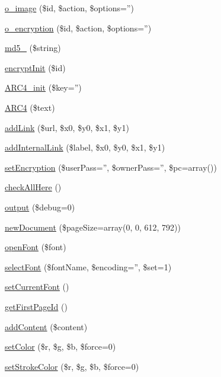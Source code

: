 \begin{DoxyCompactItemize}
\hyperlink{class_cpdf_ac2199fd5ae0ff08a49c57dc48cea87be}{o\-\_\-image} (\$id, \$action, \$options='')
\item 
\hyperlink{class_cpdf_af77067434721b4808184e6d7793fa85c}{o\-\_\-encryption} (\$id, \$action, \$options='')
\item 
\hyperlink{class_cpdf_a7c89968388709b624565f4cd0faaa167}{md5\-\_} (\$string)
\item 
\hyperlink{class_cpdf_a593c690c9c88459001b8fee0c1e02b60}{encrypt\-Init} (\$id)
\item 
\hyperlink{class_cpdf_ab9ace0c7741193acf9b665f2cac0139e}{\-A\-R\-C4\-\_\-init} (\$key='')
\item 
\hyperlink{class_cpdf_a1720331693e5f6fa093806517a79f0d6}{\-A\-R\-C4} (\$text)
\item 
\hyperlink{class_cpdf_a1f48bf2f91aec0960acebcb01548dfb0}{add\-Link} (\$url, \$x0, \$y0, \$x1, \$y1)
\item 
\hyperlink{class_cpdf_aa47771ad964538a2009e960582ef4439}{add\-Internal\-Link} (\$label, \$x0, \$y0, \$x1, \$y1)
\item 
\hyperlink{class_cpdf_a2449e87b218d05a506d4ca97fdb6d13a}{set\-Encryption} (\$user\-Pass='', \$owner\-Pass='', \$pc=array())
\item 
\hyperlink{class_cpdf_a97cd4a04c03ffbf0f9f1dde0670f25c0}{check\-All\-Here} ()
\item 
\hyperlink{class_cpdf_aa81bf39d5b682bbccdbf75c269b15729}{output} (\$debug=0)
\item 
\hyperlink{class_cpdf_ab3114927075d9643a6ce7bcffb2bb8ac}{new\-Document} (\$page\-Size=array(0, 0, 612, 792))
\item 
\hyperlink{class_cpdf_ac9e094a24b03891a8b8e1ef468b535b7}{open\-Font} (\$font)
\item 
\hyperlink{class_cpdf_a51b2f9f1095c23b3b75a8f7bf4a04533}{select\-Font} (\$font\-Name, \$encoding='', \$set=1)
\item 
\hyperlink{class_cpdf_a7c32053581b4a1c223a8c924bdd888d6}{set\-Current\-Font} ()
\item 
\hyperlink{class_cpdf_aacf9523fe9f5c860731020f7a49778a1}{get\-First\-Page\-Id} ()
\item 
\hyperlink{class_cpdf_a0063e9338d80979be51981786380eef4}{add\-Content} (\$content)
\item 
\hyperlink{class_cpdf_ad6873769b1aeb31e7acbc3be3de671a5}{set\-Color} (\$r, \$g, \$b, \$force=0)
\item 
\hyperlink{class_cpdf_a8d3584e9eee400857cd917984d025db4}{set\-Stroke\-Color} (\$r, \$g, \$b, \$force=0)

\end{DoxyCompactItemize}
